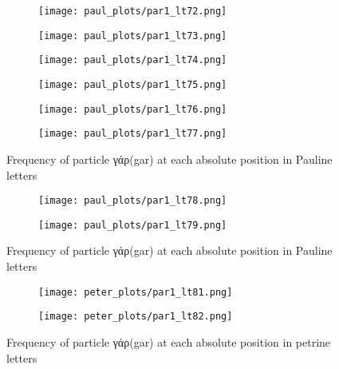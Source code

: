 \documentclass[a4paper]{article}
\renewcommand{\textgreek}[1]{{\selectlanguage{greek}#1}}
\begin{document}
\begin{figure}
\ContinuedFloat
\begin{subfigure}{0.45\textwidth}
\centering
\texttt{[image: paul\_plots/par1\_lt72.png]}
\end{subfigure}
\begin{subfigure}{0.45\textwidth}
\centering
\texttt{[image: paul\_plots/par1\_lt73.png]}
\end{subfigure}
\begin{subfigure}{0.45\textwidth}
\centering
\texttt{[image: paul\_plots/par1\_lt74.png]}
\end{subfigure}
\begin{subfigure}{0.45\textwidth}
\centering
\texttt{[image: paul\_plots/par1\_lt75.png]}
\end{subfigure}
\begin{subfigure}{0.45\textwidth}
\centering
\texttt{[image: paul\_plots/par1\_lt76.png]}
\end{subfigure}
\begin{subfigure}{0.45\textwidth}
\centering
\texttt{[image: paul\_plots/par1\_lt77.png]}
\end{subfigure}
\caption{Frequency of particle \textgreek{γάρ}(gar) at each absolute position in Pauline letters}
\end{figure}

\begin{figure}
\ContinuedFloat
\begin{subfigure}{0.45\textwidth}
\centering
\texttt{[image: paul\_plots/par1\_lt78.png]}
\end{subfigure}
\begin{subfigure}{0.45\textwidth}
\centering
\texttt{[image: paul\_plots/par1\_lt79.png]}
\end{subfigure}
\caption{Frequency of particle \textgreek{γάρ}(gar) at each absolute position in Pauline letters}
\end{figure}

\begin{figure}
\begin{subfigure}{0.45\textwidth}
\centering
\texttt{[image: peter\_plots/par1\_lt81.png]}
\end{subfigure}
\begin{subfigure}{0.45\textwidth}
\centering
\texttt{[image: peter\_plots/par1\_lt82.png]}
\end{subfigure}
\caption{Frequency of particle \textgreek{γάρ}(gar) at each absolute position in petrine letters}
\label{peter_yap}
\end{figure}
\end{document}
